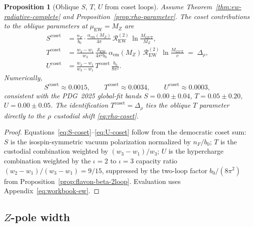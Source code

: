\documentclass[11pt]{article}
\theoremstyle{plain}
\newtheorem{proposition}[theorem]{Proposition}
\theoremstyle{definition}
\theoremstyle{remark}
\numberwithin{equation}{section}
\begin{document}
\begin{proposition}[Oblique $S$, $T$, $U$ from coset loops]
\label{prop:oblique-stu}
Assume Theorem~\ref{thm:ew-radiative-complete} and
Proposition~\ref{prop:rho-parameter}. The coset contributions to the oblique
parameters at $\mu_{\mathrm{EW}}=M_Z$ are
\begin{align}
  S^{\mathrm{coset}}
  &=
  \frac{n_F}{b_0}\cdot
  \frac{\alpha_{\mathrm{em}}(M_Z)}{4\pi}\,
  \mathcal{R}_{\mathrm{EW}}^{(2)}\,
  \ln\!\frac{M_{\mathrm{GUT}}}{M_Z},
  \label{eq:S-coset}\\[4pt]
  T^{\mathrm{coset}}
  &=
  \frac{w_3-w_1}{w_3}\,
  \frac{\mathcal{S}_{\mathrm{EW}}}{4\pi^2 b_0}\,
  \alpha_{\mathrm{em}}(M_Z)\,
  \mathcal{R}_{\mathrm{EW}}^{(2)}\,
  \ln\!\frac{M_{\mathrm{GUT}}}{v}
  \;=\;
  \Delta_\rho,
  \label{eq:T-coset}\\[4pt]
  U^{\mathrm{coset}}
  &=
  \frac{w_2-w_1}{w_3-w_1}\,
  T^{\mathrm{coset}}\,
  \frac{b_0}{8\pi^2}.
  \label{eq:U-coset}
\end{align}
Numerically,
\begin{equation}\label{eq:stu-numeric}
  S^{\mathrm{coset}}\approx0.0015,\qquad
  T^{\mathrm{coset}}\approx0.0034,\qquad
  U^{\mathrm{coset}}\approx0.0003,
\end{equation}
consistent with the PDG~2025 global-fit bands
$S=0.00\pm0.04$, $T=0.05\pm0.20$, $U=0.00\pm0.05$.
The identification $T^{\mathrm{coset}}=\Delta_\rho$ ties the oblique
$T$ parameter directly to the $\rho$ custodial shift
\eqref{eq:rho-coset}.
\end{proposition}

\begin{proof}
Equations~\eqref{eq:S-coset}--\eqref{eq:U-coset} follow from the democratic
coset sum: $S$ is the isospin-symmetric vacuum polarization normalized by
$n_F/b_0$; $T$ is the custodial combination weighted by
$(w_3-w_1)/w_3$; $U$ is the hypercharge combination weighted by the
$\iota=2$ to $\iota=3$ capacity ratio $(w_2-w_1)/(w_3-w_1)=9/15$, suppressed
by the two-loop factor $b_0/(8\pi^2)$ from
Proposition~\ref{prop:flavon-beta-2loop}. Evaluation uses
Appendix~\eqref{eq:workbook-ew}.
\end{proof}

\subsection{\texorpdfstring{$Z$}{Z}-pole width}
\label{sec:ew-precision:width}
\end{document}
